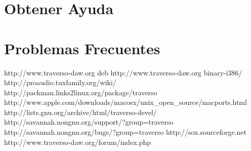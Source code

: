 \documentclass[a4paper,
               12pt,
               pdftex,
               twoside,
               smallheadings,
               headinclude,
               headsepline,
               DIV16,
               BCOR10mm,
               halfparskip
               ]{scrreprt}
\begin{document}
\chapter{Obtener Ayuda\label{sect_help}}

\chapter{Problemas Frecuentes}


\begin{thebibliography}{xx}
   http://www.traverso-daw.org
   deb http://www.traverso-daw.org binary-i386/
   http://proaudio.tuxfamily.org/wiki/
   http://packman.links2linux.org/package/traverso
   http://www.apple.com/downloads/macosx/unix\_open\_source/macports.html
   http://lists.gnu.org/archive/html/traverso-devel/
   http://savannah.nongnu.org/support/?group=traverso
   http://savannah.nongnu.org/bugs/?group=traverso
   http://sox.sourceforge.net
   http://www.traverso-daw.org/forum/index.php
\end{thebibliography}
\end{document}
